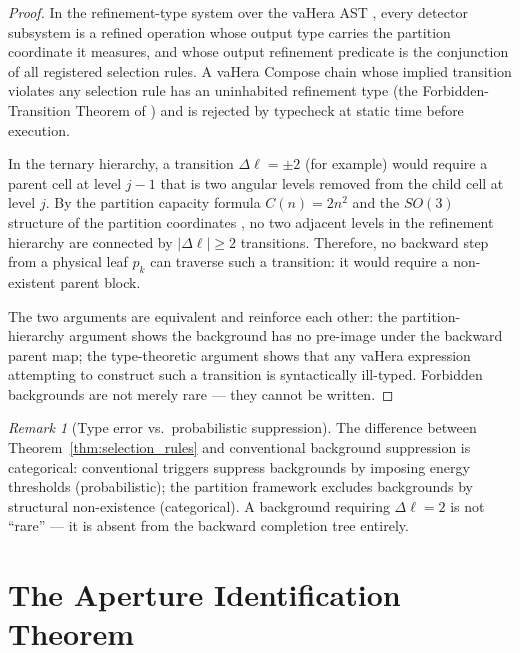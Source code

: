 \documentclass[twocolumn,10pt,a4paper]{article}
\theoremstyle{thmstyle}
\theoremstyle{definition}
\theoremstyle{remark}
\newtheorem{remark}[theorem]{Remark}
\begin{document}
\begin{proof}
In the refinement-type system over the vaHera AST
\citep{companion:types}, every detector subsystem is a refined operation
whose output type carries the partition coordinate it measures, and whose
output refinement predicate is the conjunction of all registered selection
rules. A vaHera Compose chain whose implied transition violates any selection
rule has an uninhabited refinement type (the Forbidden-Transition Theorem of
\citealt{companion:types}) and is rejected by $\mathrm{typecheck}$ at static
time before execution.

In the ternary hierarchy, a transition $\Delta\ell = \pm 2$ (for example)
would require a parent cell at level $j-1$ that is two angular levels removed
from the child cell at level $j$. By the partition capacity formula
$C(n) = 2n^2$ and the $SO(3)$ structure of the partition coordinates
\citep{companion:math}, no two adjacent levels in the refinement hierarchy
are connected by $|\Delta\ell| \geq 2$ transitions. Therefore, no backward
step from a physical leaf $p_k$ can traverse such a transition: it would
require a non-existent parent block.

The two arguments are equivalent and reinforce each other: the
partition-hierarchy argument shows the background has no pre-image under
the backward parent map; the type-theoretic argument shows that any vaHera
expression attempting to construct such a transition is syntactically
ill-typed. Forbidden backgrounds are not merely rare --- they cannot be written.
\end{proof}

\begin{remark}[Type error vs.\ probabilistic suppression]
The difference between Theorem~\ref{thm:selection_rules} and conventional
background suppression is categorical: conventional triggers suppress
backgrounds by imposing energy thresholds (probabilistic); the partition
framework excludes backgrounds by structural non-existence (categorical).
A background requiring $\Delta\ell = 2$ is not ``rare'' — it is absent from
the backward completion tree entirely.
\end{remark}

\section{The Aperture Identification Theorem}
\label{sec:aperture}
\end{document}
